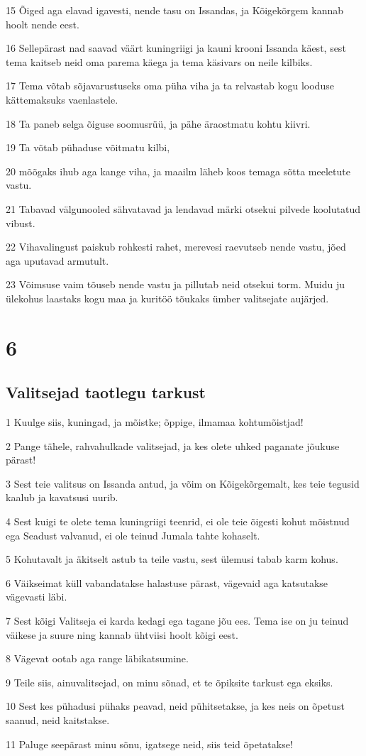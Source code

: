 \par 15 Õiged aga elavad igavesti, nende tasu on Issandas, ja Kõigekõrgem kannab hoolt nende eest.
\par 16 Sellepärast nad saavad väärt kuningriigi ja kauni krooni Issanda käest, sest tema kaitseb neid oma parema käega ja tema käsivars on neile kilbiks.
\par 17 Tema võtab sõjavarustuseks oma püha viha ja ta relvastab kogu looduse kättemaksuks vaenlastele.
\par 18 Ta paneb selga õiguse soomusrüü, ja pähe äraostmatu kohtu kiivri.
\par 19 Ta võtab pühaduse võitmatu kilbi,
\par 20 mõõgaks ihub aga kange viha, ja maailm läheb koos temaga sõtta meeletute vastu.
\par 21 Tabavad välgunooled sähvatavad ja lendavad märki otsekui pilvede koolutatud vibust.
\par 22 Vihavalingust paiskub rohkesti rahet, merevesi raevutseb nende vastu, jõed aga uputavad armutult.
\par 23 Võimsuse vaim tõuseb nende vastu ja pillutab neid otsekui torm. Muidu ju ülekohus laastaks kogu maa ja kuritöö tõukaks ümber valitsejate aujärjed. 

\chapter{6}

\section*{Valitsejad taotlegu tarkust}

\par 1 Kuulge siis, kuningad, ja mõistke; õppige, ilmamaa kohtumõistjad!
\par 2 Pange tähele, rahvahulkade valitsejad, ja kes olete uhked paganate jõukuse pärast!
\par 3 Sest teie valitsus on Issanda antud, ja võim on Kõigekõrgemalt, kes teie tegusid kaalub ja kavatsusi uurib.
\par 4 Sest kuigi te olete tema kuningriigi teenrid, ei ole teie õigesti kohut mõistnud ega Seadust valvanud, ei ole teinud Jumala tahte kohaselt.
\par 5 Kohutavalt ja äkitselt astub ta teile vastu, sest ülemusi tabab karm kohus.
\par 6 Väikseimat küll vabandatakse halastuse pärast, vägevaid aga katsutakse vägevasti läbi.
\par 7 Sest kõigi Valitseja ei karda kedagi ega tagane jõu ees. Tema ise on ju teinud väikese ja suure ning kannab ühtviisi hoolt kõigi eest.
\par 8 Vägevat ootab aga range läbikatsumine.
\par 9 Teile siis, ainuvalitsejad, on minu sõnad, et te õpiksite tarkust ega eksiks.
\par 10 Sest kes pühadusi pühaks peavad, neid pühitsetakse, ja kes neis on õpetust saanud, neid kaitstakse.
\par 11 Paluge seepärast minu sõnu, igatsege neid, siis teid õpetatakse! 

